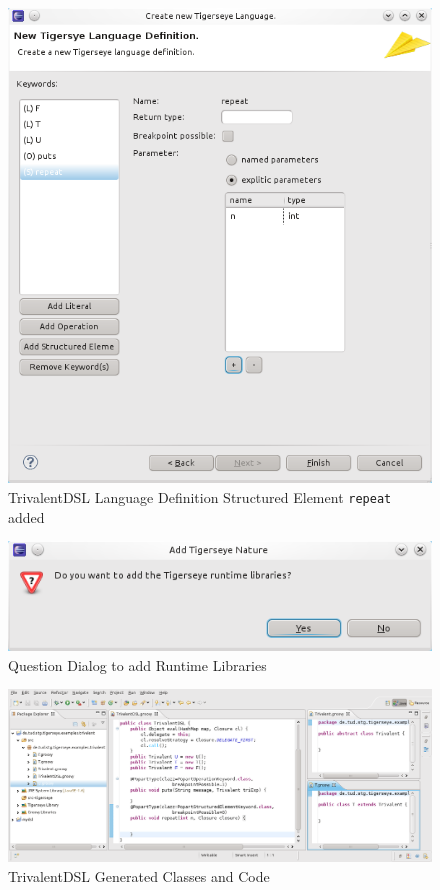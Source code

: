 	\begin{figure}
	  \centering
	  \includegraphics[width=.5\textwidth,keepaspectratio=true]{../pics/example_newlang_structuredelementadded.png}
	  \caption{TrivalentDSL Language Definition Structured Element \texttt{repeat} added}\label{fig:example_newlang_structuredelementadded}
	\end{figure}
	
	\begin{figure}
	  \centering
	  \includegraphics[width=.5\textwidth,keepaspectratio=true]{../pics/example_newlang_addruntime.png}
	  \caption{Question Dialog to add \tiger Runtime Libraries}\label{fig:example_newlang_addruntime}
	\end{figure}

	\begin{figure}
	  \centering
	  \includegraphics[width=\textwidth,keepaspectratio=true]{../pics/example_newlang_generatedcode.png}
	  \caption{TrivalentDSL Generated Classes and Code}\label{fig:example_newlang_generatedcode}
	\end{figure}

